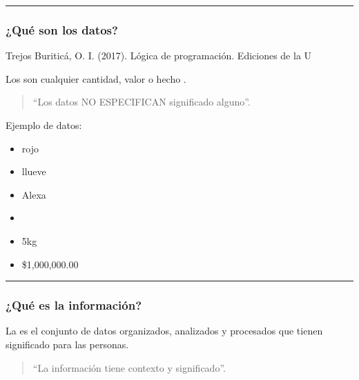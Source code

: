 \documentclass[letterpaper,10pt,spanish]{sphinxmanual}
\begin{document}
\bigskip\hrule\bigskip



\subsubsection{¿Qué son los datos?}
\label{\detokenize{1_guias/8logica/G822:que-son-los-datos}}
\sphinxAtStartPar
%
\begin{footnote}[1]\sphinxAtStartFootnote
Trejos Buriticá, O. I. (2017). Lógica de programación. Ediciones de la U
%
\end{footnote} Los  son cualquier cantidad, valor o hecho .
\begin{quote}

\sphinxAtStartPar
“Los datos NO ESPECIFICAN significado alguno”.
\end{quote}

\sphinxAtStartPar
Ejemplo de datos:
\begin{itemize}
\item {} 
\sphinxAtStartPar
rojo

\item {} 
\sphinxAtStartPar
llueve

\item {} 
\sphinxAtStartPar
Alexa

\item {} 
\sphinxAtStartPar
33cm

\item {} 
\sphinxAtStartPar
5kg

\item {} 
\sphinxAtStartPar
\$1,000,000.00

\end{itemize}


\bigskip\hrule\bigskip



\subsubsection{¿Qué es la información?}
\label{\detokenize{1_guias/8logica/G822:que-es-la-informacion}}
\sphinxAtStartPar
\sphinxfootnotemark[1] La  es el conjunto de datos organizados, analizados y procesados que tienen significado para las personas.
\begin{quote}

\sphinxAtStartPar
“La información tiene contexto y significado”.
\end{quote}
\end{document}
